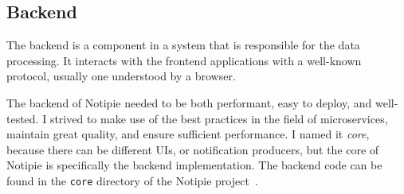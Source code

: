 \subsection{Backend}\label{sec:backend}

The backend is a component in a system
that is responsible for the data processing.
It interacts with the frontend applications
with a well-known protocol,
usually one understood by a browser.

The backend of Notipie
needed to be both performant,
easy to deploy,
and well-tested.
I strived to make use of the best practices
in the field of microservices,
maintain great quality,
and ensure sufficient performance.
I named it \textit{core},
because there can be different \acp{UI},
or notification producers,
but the core of Notipie
is specifically the backend implementation.
The backend code can be found in the
\texttt{core} directory of the Notipie project~\cite{sewera_notipie_2022}.




